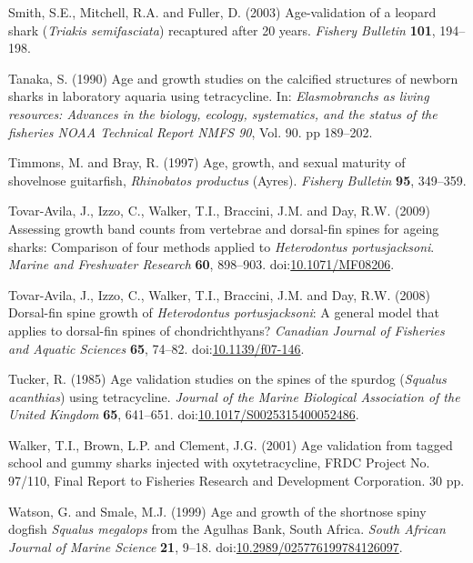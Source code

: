 \documentclass[]{article}
\begin{document}
\hypertarget{ref-smith_age-validation_2003}{}
Smith, S.E., Mitchell, R.A. and Fuller, D. (2003) Age-validation of a
leopard shark (\emph{Triakis semifasciata}) recaptured after 20 years.
\emph{Fishery Bulletin} \textbf{101}, 194--198.

\hypertarget{ref-tanaka_age_1990}{}
Tanaka, S. (1990) Age and growth studies on the calcified structures of
newborn sharks in laboratory aquaria using tetracycline. In:
\emph{Elasmobranchs as living resources: Advances in the biology,
ecology, systematics, and the status of the fisheries NOAA Technical
Report NMFS 90}, Vol. 90. pp 189--202.

\hypertarget{ref-timmons_age_1997}{}
Timmons, M. and Bray, R. (1997) Age, growth, and sexual maturity of
shovelnose guitarfish, \emph{Rhinobatos productus} (Ayres).
\emph{Fishery Bulletin} \textbf{95}, 349--359.

\hypertarget{ref-tovar-avila_assessing_2009}{}
Tovar-Avila, J., Izzo, C., Walker, T.I., Braccini, J.M. and Day, R.W.
(2009) Assessing growth band counts from vertebrae and dorsal-fin spines
for ageing sharks: Comparison of four methods applied to
\emph{Heterodontus portusjacksoni}. \emph{Marine and Freshwater
Research} \textbf{60}, 898--903.
doi:\href{https://doi.org/10.1071/MF08206}{10.1071/MF08206}.

\hypertarget{ref-tovar-avila_dorsal-fin_2008}{}
Tovar-Avila, J., Izzo, C., Walker, T.I., Braccini, J.M. and Day, R.W.
(2008) Dorsal-fin spine growth of \emph{Heterodontus portusjacksoni}: A
general model that applies to dorsal-fin spines of chondrichthyans?
\emph{Canadian Journal of Fisheries and Aquatic Sciences} \textbf{65},
74--82. doi:\href{https://doi.org/10.1139/f07-146}{10.1139/f07-146}.

\hypertarget{ref-tucker_age_1985}{}
Tucker, R. (1985) Age validation studies on the spines of the spurdog
(\emph{Squalus acanthias}) using tetracycline. \emph{Journal of the
Marine Biological Association of the United Kingdom} \textbf{65},
641--651.
doi:\href{https://doi.org/10.1017/S0025315400052486}{10.1017/S0025315400052486}.

\hypertarget{ref-walker_age_2001}{}
Walker, T.I., Brown, L.P. and Clement, J.G. (2001) Age validation from
tagged school and gummy sharks injected with oxytetracycline, FRDC
Project No. 97/110, Final Report to Fisheries Research and Development
Corporation. 30 pp.

\hypertarget{ref-watson_age_1999}{}
Watson, G. and Smale, M.J. (1999) Age and growth of the shortnose spiny
dogfish \emph{Squalus megalops} from the Agulhas Bank, South Africa.
\emph{South African Journal of Marine Science} \textbf{21}, 9--18.
doi:\href{https://doi.org/10.2989/025776199784126097}{10.2989/025776199784126097}.
\end{document}
